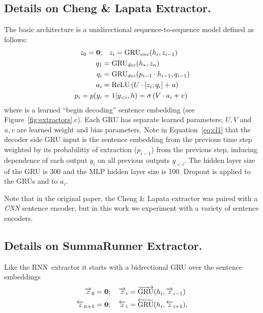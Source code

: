 \subsection{Details on Cheng \& Lapata Extractor.} \label{app:clextractor}
The basic architecture is a unidirectional
sequence-to-sequence
model defined as follows:
\begin{align}
    \encExtHidden_0 = \textbf{0};&\quad   \encExtHidden_i = \gru_{enc}(\sentvec_i, \encExtHidden_{i-1}) \\
    \decExtHidden_1 &= \gru_{dec}(\sentEmb[*], \encExtHidden_{\docSize}) \\
    \decExtHidden_i &= \gru_{dec}(p_{i-1} \cdot \sentvec_{i-1}, \decExtHidden_{i-1}) \label{eq:cl1} \\
   \logits_i &= \relu\left(U \cdot [\encExtHidden_i; \decExtHidden_i] + u \right)\\
    p_i = p(\slabel_i&=1|\slabel_{<i}, \sentvec) = \sigma\left(V\cdot \logits_i + v  \right) 
\end{align}
where \sentEmb[*] is a learned ``begin decoding'' sentence embedding
(see Figure~\ref{fig:extractors}.c).
Each GRU has separate learned 
parameters; $U, V$ and $u, v$ are learned weight and bias parameters.
Note in Equation~\ref{eq:cl1} that 
the decoder side GRU input is the sentence embedding from the previous time
step weighted by its probabilitiy of extraction ($p_{i-1}$) from the 
previous step, inducing dependence of each output $y_i$ on all previous 
outputs $y_{<i}$.
The hidden layer size of the GRU is 300 and the MLP hidden layer
size is 100. Dropout is applied to the GRUs and to $a_i$.



Note that in the original paper, the Cheng \& Lapata extractor was paired 
with
a \textit{CNN} sentence encoder, but in this work we experiment with a variety
of sentence encoders.

\subsection{Details on SummaRunner Extractor.} \label{app:srextractor}
Like the
RNN~extractor it starts with a bidrectional GRU over the sentence 
embeddings 
\begin{align}
    \overrightarrow{z}_0 = \textbf{0}&;\quad \overrightarrow{z}_i = \overrightarrow{\operatorname{GRU}}(h_i, \overrightarrow{z}_{i-1}) \\
    \overleftarrow{z}_{n + 1} = \textbf{0}&;\quad \overleftarrow{z}_i = \overleftarrow{\operatorname{GRU}}(h_i, \overleftarrow{z}_{i+1}),
\end{align}

